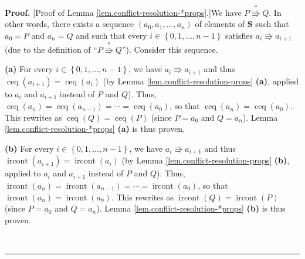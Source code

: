 \documentclass[numbers=enddot,12pt,final,onecolumn,notitlepage]{scrartcl}%
\theoremstyle{definition}
\newenvironment{proof}[1][Proof]{\noindent\textbf{#1.} }{\ \rule{0.5em}{0.5em}}
\newenvironment{verlong}{}{}
\begin{document}
\begin{verlong}
\begin{proof}
[Proof of Lemma \ref{lem.conflict-resolution-*props}.]We have $P\overset{\ast
}{\Rrightarrow}Q$. In other words, there exists a sequence $\left(
a_{0},a_{1},\ldots,a_{n}\right)  $ of elements of $\mathbf{S}$ such that
$a_{0}=P$ and $a_{n}=Q$ and such that every $i\in\left\{  0,1,\ldots
,n-1\right\}  $ satisfies $a_{i}\Rrightarrow a_{i+1}$ (due to the definition
of \textquotedblleft$P\overset{\ast}{\Rrightarrow}Q$\textquotedblright).
Consider this sequence.

\textbf{(a)} For every $i\in\left\{  0,1,\ldots,n-1\right\}  $, we have
$a_{i}\Rrightarrow a_{i+1}$ and thus $\operatorname*{ceq}\left(
a_{i+1}\right)  =\operatorname*{ceq}\left(  a_{i}\right)  $ (by Lemma
\ref{lem.conflict-resolution-props} \textbf{(a)}, applied to $a_{i}$ and
$a_{i+1}$ instead of $P$ and $Q$). Thus, $\operatorname*{ceq}\left(
a_{n}\right)  =\operatorname*{ceq}\left(  a_{n-1}\right)  =\cdots
=\operatorname*{ceq}\left(  a_{0}\right)  $, so that $\operatorname*{ceq}%
\left(  a_{n}\right)  =\operatorname*{ceq}\left(  a_{0}\right)  $. This
rewrites as $\operatorname*{ceq}\left(  Q\right)  =\operatorname*{ceq}\left(
P\right)  $ (since $P=a_{0}$ and $Q=a_{n}$). Lemma
\ref{lem.conflict-resolution-*props} \textbf{(a)} is thus proven.

\textbf{(b)} For every $i\in\left\{  0,1,\ldots,n-1\right\}  $, we have
$a_{i}\Rrightarrow a_{i+1}$ and thus $\operatorname*{ircont}\left(
a_{i+1}\right)  =\operatorname*{ircont}\left(  a_{i}\right)  $ (by Lemma
\ref{lem.conflict-resolution-props} \textbf{(b)}, applied to $a_{i}$ and
$a_{i+1}$ instead of $P$ and $Q$). Thus, $\operatorname*{ircont}\left(
a_{n}\right)  =\operatorname*{ircont}\left(  a_{n-1}\right)  =\cdots
=\operatorname*{ircont}\left(  a_{0}\right)  $, so that
$\operatorname*{ircont}\left(  a_{n}\right)  =\operatorname*{ircont}\left(
a_{0}\right)  $. This rewrites as $\operatorname*{ircont}\left(  Q\right)
=\operatorname*{ircont}\left(  P\right)  $ (since $P=a_{0}$ and $Q=a_{n}$).
Lemma \ref{lem.conflict-resolution-*props} \textbf{(b)} is thus proven.


\end{proof}
\end{verlong}
\end{document}
